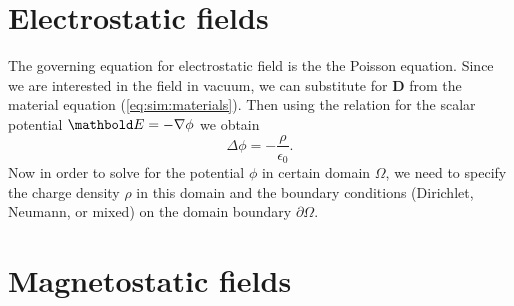 \section{Electrostatic fields}

The governing equation for electrostatic field is the the Poisson
equation. Since we are interested in the field in vacuum, we can substitute
for $\mathbold{D}$ from the material equation (\ref{eq:sim:materials}). Then using the relation for the scalar potential $\mb E = -\nabla \phi$ we obtain
\begin{equation}
\Delta\phi=-\frac{\rho}{\epsilon_{0}}\text{.}
\end{equation}
Now in order to solve for the potential $\phi$ in certain domain $\Omega$, we need to specify the charge density $\rho$ in this domain and the boundary conditions (Dirichlet, Neumann, or mixed) on the domain boundary $\partial\Omega$.



\section{Magnetostatic fields}
